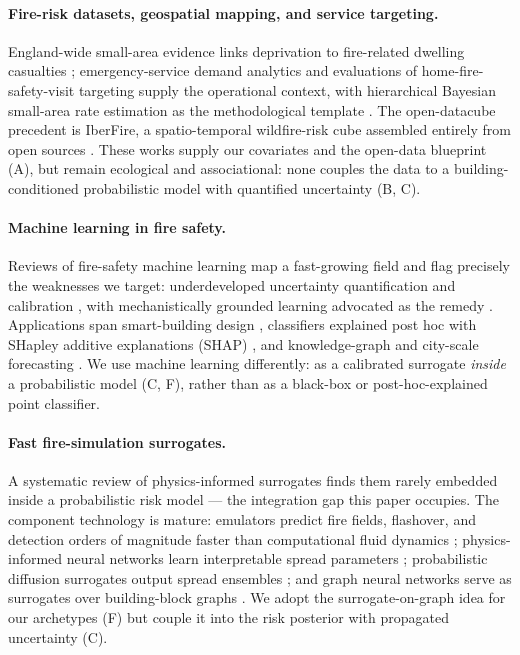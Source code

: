 \paragraph{Fire-risk datasets, geospatial mapping, and service targeting.}
England-wide small-area evidence links deprivation to fire-related dwelling
casualties \citep{li2022}; emergency-service demand analytics
\citep{londonblue2025} and evaluations of home-fire-safety-visit targeting
\citep{waring2024} supply the operational context, with hierarchical Bayesian
small-area rate estimation as the methodological template \citep{macnab2003}.
The open-datacube precedent is IberFire, a spatio-temporal wildfire-risk cube
assembled entirely from open sources \citep{erzibengoa2025iberfire}. These
works supply our covariates and the open-data blueprint (A), but remain
ecological and associational: none couples the data to a building-conditioned
probabilistic model with quantified uncertainty (B, C).

\paragraph{Machine learning in fire safety.}
Reviews of fire-safety machine learning map a fast-growing field and flag
precisely the weaknesses we target: underdeveloped uncertainty quantification
and calibration \citep{yildiz2025ml,tapehnaser2022}, with mechanistically grounded
learning advocated as the remedy \citep{naser2021}. Applications span
smart-building design \citep{zeng2024smart}, classifiers explained post hoc
with SHapley additive explanations (SHAP) \citep{lu2023stadium,dai2025interp},
and knowledge-graph and city-scale forecasting
\citep{xu2025knowgraph,lee2025urbanfire}. We use machine learning differently:
as a calibrated surrogate \emph{inside} a probabilistic model (C, F), rather
than as a black-box or post-hoc-explained point classifier.

\paragraph{Fast fire-simulation surrogates.}
A systematic review of physics-informed surrogates finds them rarely embedded
inside a probabilistic risk model \citep{yarmohammadian2025pism} --- the
integration gap this paper occupies. The component technology is mature:
emulators predict fire fields, flashover, and detection orders of magnitude
faster than computational fluid dynamics
\citep{lattimer2020,wang2021pflash,nguyen2022,zeng2022ifetool,zeng2024jcde};
physics-informed neural networks learn interpretable spread parameters
\citep{vogiatzoglou2025}; probabilistic diffusion surrogates output spread
ensembles \citep{yu2026}; and graph neural networks serve as surrogates over
building-block graphs \citep{wu2025gnn}. We adopt the surrogate-on-graph idea
for our archetypes (F) but couple it into the risk posterior with propagated
uncertainty (C).

